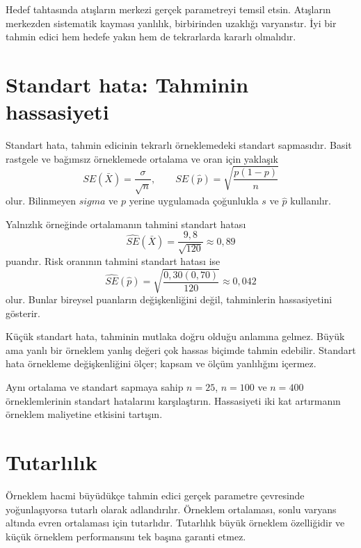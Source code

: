 \begin{sezgibox}
Hedef tahtasında atışların merkezi gerçek parametreyi temsil etsin. Atışların
merkezden sistematik kayması yanlılık, birbirinden uzaklığı varyanstır. İyi bir
tahmin edici hem hedefe yakın hem de tekrarlarda kararlı olmalıdır.
\end{sezgibox}

\section{Standart hata: Tahminin hassasiyeti}

Standart hata, tahmin edicinin tekrarlı örneklemedeki standart sapmasıdır.
Basit rastgele ve bağımsız örneklemede ortalama ve oran için yaklaşık
\[
SE(\bar X)=\frac{\sigma}{\sqrt n},
\qquad
SE(\hat p)=\sqrt{\frac{p(1-p)}{n}}
\]
olur. Bilinmeyen $sigma$ ve $p$ yerine uygulamada çoğunlukla $s$ ve
$\hat p$ kullanılır.

Yalnızlık örneğinde ortalamanın tahmini standart hatası
\[
\widehat{SE}(\bar X)=\frac{9{,}8}{\sqrt{120}}\approx0{,}89
\]
puandır. Risk oranının tahmini standart hatası ise
\[
\widehat{SE}(\hat p)
=\sqrt{\frac{0{,}30(0{,}70)}{120}}
\approx0{,}042
\]
olur. Bunlar bireysel puanların değişkenliğini değil, tahminlerin
hassasiyetini gösterir.

\begin{mistakebox}
Küçük standart hata, tahminin mutlaka doğru olduğu anlamına gelmez. Büyük ama
yanlı bir örneklem yanlış değeri çok hassas biçimde tahmin edebilir. Standart
hata örnekleme değişkenliğini ölçer; kapsam ve ölçüm yanlılığını içermez.
\end{mistakebox}

\begin{etkinlik}
Aynı ortalama ve standart sapmaya sahip $n=25$, $n=100$ ve $n=400$
örneklemlerinin standart hatalarını karşılaştırın. Hassasiyeti iki kat
artırmanın örneklem maliyetine etkisini tartışın.
\end{etkinlik}

\section{Tutarlılık}

Örneklem hacmi büyüdükçe tahmin edici gerçek parametre çevresinde yoğunlaşıyorsa
tutarlı olarak adlandırılır. Örneklem ortalaması, sonlu varyans altında evren
ortalaması için tutarlıdır. Tutarlılık büyük örneklem özelliğidir ve küçük
örneklem performansını tek başına garanti etmez.

